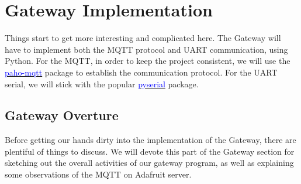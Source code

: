 \section{Gateway Implementation}
Things start to get more interesting and complicated here. The Gateway will have to implement both the MQTT protocol and UART communication, using Python. For the MQTT, in order to keep the project consistent, we will use the \href{https://pypi.org/project/paho-mqtt/}{\textcolor{blue}{paho-mqtt}} package to establish the communication protocol. For the UART serial, we will stick with the popular \href{https://pypi.org/project/pyserial/}{\textcolor{blue}{pyserial}} package.

\subsection{Gateway Overture}
\label{subsection:gtw-overture}
Before getting our hands dirty into the implementation of the Gateway, there are plentiful of things to discuss. We will devote this part of the Gateway section for sketching out the overall activities of our gateway program, as well as explaining some observations of the MQTT on Adafruit server.

